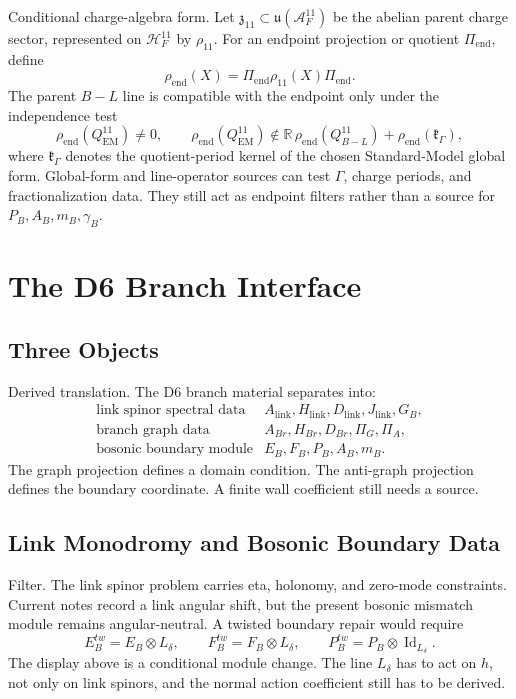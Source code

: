 \documentclass[11pt]{article}
\newcommand{\RR}{\mathbb{R}}
\newcommand{\Id}{\operatorname{Id}}
\begin{document}
Conditional charge-algebra form.  Let
\(\mathfrak z_{11}\subset\mathfrak u(\mathcal A^{11}_F)\) be the abelian
parent charge sector, represented on \(\mathcal H^{11}_F\) by \(\rho_{11}\).
For an endpoint projection or quotient \(\Pi_{\mathrm{end}}\), define
\[
  \rho_{\mathrm{end}}(X)
    =\Pi_{\mathrm{end}}\rho_{11}(X)\Pi_{\mathrm{end}} .
\]
The parent \(B-L\) line is compatible with the endpoint only under the
independence test
\[
  \rho_{\mathrm{end}}(Q^{11}_{\mathrm{EM}})\ne 0,\qquad
  \rho_{\mathrm{end}}(Q^{11}_{\mathrm{EM}})
    \notin
    \RR\,\rho_{\mathrm{end}}(Q^{11}_{B-L})
      +\rho_{\mathrm{end}}(\mathfrak k_\Gamma),
\]
where \(\mathfrak k_\Gamma\) denotes the quotient-period kernel of the chosen
Standard-Model global form.  Global-form and line-operator sources can test
\(\Gamma\), charge periods, and fractionalization data.  They still act as
endpoint filters rather than a source for \(P_B,A_B,m_B,\gamma_B\).

\section{The D6 Branch Interface}

\subsection{Three Objects}

Derived translation.  The D6 branch material separates into:
\[
\begin{array}{ll}
\text{link spinor spectral data} & A_{\mathrm{link}},H_{\mathrm{link}},D_{\mathrm{link}},J_{\mathrm{link}},G_B,\\
\text{branch graph data} & A_{Br},H_{Br},D_{Br},\Pi_G,\Pi_A,\\
\text{bosonic boundary module} & E_B,F_B,P_B,A_B,m_B.
\end{array}
\]
The graph projection defines a domain condition.  The anti-graph projection
defines the boundary coordinate.  A finite wall coefficient still needs a
source.

\subsection{Link Monodromy and Bosonic Boundary Data}

Filter.  The link spinor problem carries eta, holonomy, and zero-mode
constraints.  Current notes record a link angular shift, but the present
bosonic mismatch module remains angular-neutral.  A twisted boundary repair
would require
\[
  E_B^{tw}=E_B\otimes L_\delta,\qquad
  F_B^{tw}=F_B\otimes L_\delta,\qquad
  P_B^{tw}=P_B\otimes \Id_{L_\delta}.
\]
The display above is a conditional module change.  The line \(L_\delta\) has
to act on \(h\), not only on link spinors, and the normal action coefficient
still has to be derived.
\end{document}
